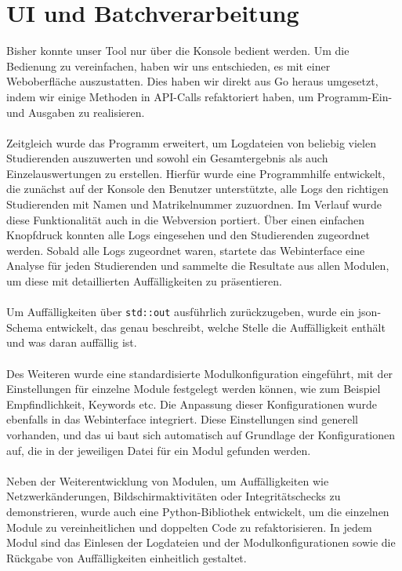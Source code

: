\section{UI und Batchverarbeitung}
Bisher konnte unser Tool nur über die Konsole bedient werden. 
Um die Bedienung zu vereinfachen, haben wir uns entschieden, es mit einer Weboberfläche auszustatten. 
Dies haben wir direkt aus Go heraus umgesetzt, indem wir einige Methoden in API-Calls refaktoriert haben, um Programm-Ein- und Ausgaben zu realisieren.\\
\\
Zeitgleich wurde das Programm erweitert, um Logdateien von beliebig vielen Studierenden auszuwerten und sowohl ein Gesamtergebnis als auch Einzelauswertungen zu erstellen. 
Hierfür wurde eine Programmhilfe entwickelt, die zunächst auf der Konsole den Benutzer unterstützte, alle Logs den richtigen Studierenden mit Namen und Matrikelnummer zuzuordnen. 
Im Verlauf wurde diese Funktionalität auch in die Webversion portiert. Über einen einfachen Knopfdruck konnten alle Logs eingesehen und den Studierenden zugeordnet werden. 
Sobald alle Logs zugeordnet waren, startete das Webinterface eine Analyse für jeden Studierenden und sammelte die Resultate aus allen Modulen, um diese mit detaillierten Auffälligkeiten zu präsentieren.\\
\\
Um Auffälligkeiten über \texttt{std::out} ausführlich zurückzugeben, wurde ein \gls{json}-Schema entwickelt, das genau beschreibt, welche Stelle die Auffälligkeit enthält und was daran auffällig ist.\\
\\
Des Weiteren wurde eine standardisierte Modulkonfiguration eingeführt, mit der Einstellungen für einzelne Module festgelegt werden können, wie zum Beispiel Empfindlichkeit, Keywords etc. Die Anpassung dieser Konfigurationen wurde ebenfalls in das Webinterface integriert. Diese Einstellungen sind generell vorhanden, und das \gls{ui} baut sich automatisch auf Grundlage der Konfigurationen auf, die in der jeweiligen Datei für ein Modul gefunden werden.\\
\\
Neben der Weiterentwicklung von Modulen, um Auffälligkeiten wie Netzwerkänderungen, Bildschirmaktivitäten oder Integritätschecks zu demonstrieren, wurde auch eine Python-Bibliothek entwickelt, um die einzelnen Module zu vereinheitlichen und doppelten Code zu refaktorisieren. 
In jedem Modul sind das Einlesen der Logdateien und der Modulkonfigurationen sowie die Rückgabe von Auffälligkeiten einheitlich gestaltet.

